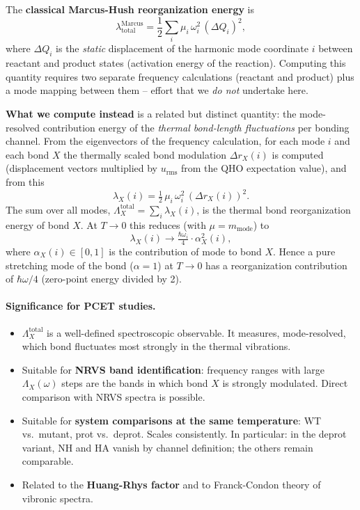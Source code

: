 \documentclass[11pt,a4paper,twoside]{article}
\theoremstyle{remark}
\begin{document}
The \textbf{classical Marcus-Hush reorganization energy}
\cite{Marcus1956,Marcus1993} is
\begin{equation}
  \lambda^{\text{Marcus}}_\text{total}
  = \frac{1}{2}\sum_i \mu_i\,\omega_i^2\,(\Delta Q_i)^2,
  \label{eq:marcus-hush}
\end{equation}
where $\Delta Q_i$ is the \emph{static} displacement of the
harmonic mode coordinate $i$ between reactant and product states
(activation energy of the reaction). Computing this quantity
requires two separate frequency calculations (reactant and
product) plus a mode mapping between them -- effort that we
\emph{do not} undertake here.

\textbf{What we compute instead} is a related but distinct
quantity: the mode-resolved contribution energy of the
\emph{thermal bond-length fluctuations} per bonding channel. From
the eigenvectors of the frequency calculation, for each mode $i$
and each bond $X$ the thermally scaled bond modulation
$\Delta r_X(i)$ is computed (displacement vectors multiplied by
$u_\text{rms}$ from the QHO expectation value), and from this
\begin{equation}
  \lambda_X(i) = \tfrac{1}{2}\,\mu_i\,\omega_i^2\,(\Delta r_X(i))^2.
  \label{eq:lambda-mode}
\end{equation}
The sum over all modes,
$\Lambda_X^\text{total} = \sum_i \lambda_X(i)$, is the thermal
bond reorganization energy of bond $X$. At $T \to 0$ this reduces
(with $\mu = m_\text{mode}$) to
\begin{equation}
  \lambda_X(i) \to \tfrac{\hbar\omega_i}{4} \cdot \alpha_X^2(i),
\end{equation}
where $\alpha_X(i) \in [0, 1]$ is the contribution of mode to
bond $X$. Hence a pure stretching mode of the bond ($\alpha = 1$)
at $T \to 0$ has a reorganization contribution of $\hbar\omega/4$
(zero-point energy divided by 2).

\paragraph{Significance for PCET studies.}
\begin{itemize}\setlength{\itemsep}{0pt}
  \item $\Lambda_X^\text{total}$ is a well-defined spectroscopic
        observable. It measures, mode-resolved, which bond fluctuates
        most strongly in the thermal vibrations.
  \item Suitable for \textbf{NRVS band identification}: frequency
        ranges with large $\Lambda_X(\omega)$ steps are the bands
        in which bond $X$ is strongly modulated. Direct comparison
        with NRVS spectra is possible.
  \item Suitable for \textbf{system comparisons at the same
        temperature}: WT vs.\ mutant, prot vs.\ deprot. Scales
        consistently. In particular: in the deprot variant, NH
        and HA vanish by channel definition; the others remain
        comparable.
  \item Related to the \textbf{Huang-Rhys factor}
        \cite{HuangRhys1950} and to Franck-Condon theory of
        vibronic spectra.
\end{itemize}
\end{document}
